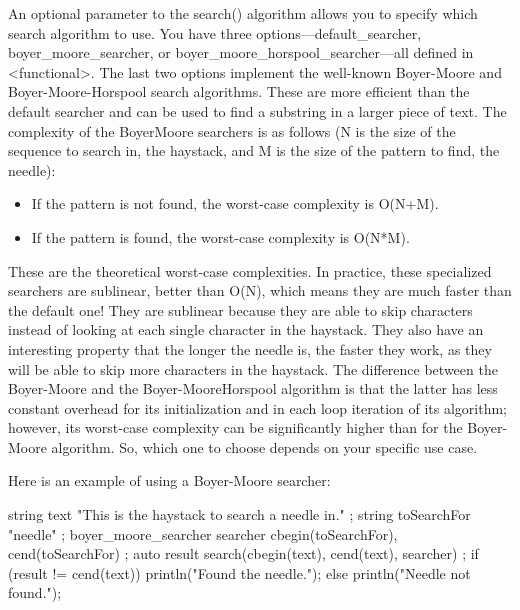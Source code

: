 
An optional parameter to the search() algorithm allows you to specify which search algorithm to use. You have three options—default\_searcher, boyer\_moore\_searcher, or boyer\_moore\_horspool\_searcher—all defined in <functional>. The last two options implement the well-known Boyer-Moore and Boyer-Moore-Horspool search algorithms. These are more efficient than the default searcher and can be used to find a substring in a larger piece of text. The complexity of the BoyerMoore searchers is as follows (N is the size of the sequence to search in, the haystack, and M is the size of the pattern to find, the needle):

\begin{itemize}
\item
If the pattern is not found, the worst-case complexity is O(N+M).

\item
If the pattern is found, the worst-case complexity is O(N*M).
\end{itemize}

These are the theoretical worst-case complexities. In practice, these specialized searchers are sublinear, better than O(N), which means they are much faster than the default one! They are sublinear because they are able to skip characters instead of looking at each single character in the haystack. They also have an interesting property that the longer the needle is, the faster they work, as they will be able to skip more characters in the haystack. The difference between the Boyer-Moore and the Boyer-MooreHorspool algorithm is that the latter has less constant overhead for its initialization and in each loop iteration of its algorithm; however, its worst-case complexity can be significantly higher than for the Boyer-Moore algorithm. So, which one to choose depends on your specific use case.

Here is an example of using a Boyer-Moore searcher:

\begin{cpp}
string text { "This is the haystack to search a needle in." };
string toSearchFor { "needle" };
boyer_moore_searcher searcher { cbegin(toSearchFor), cend(toSearchFor) };
auto result { search(cbegin(text), cend(text), searcher) };
if (result != cend(text)) {
    println("Found the needle.");
} else {
    println("Needle not found.");
}
\end{cpp}


